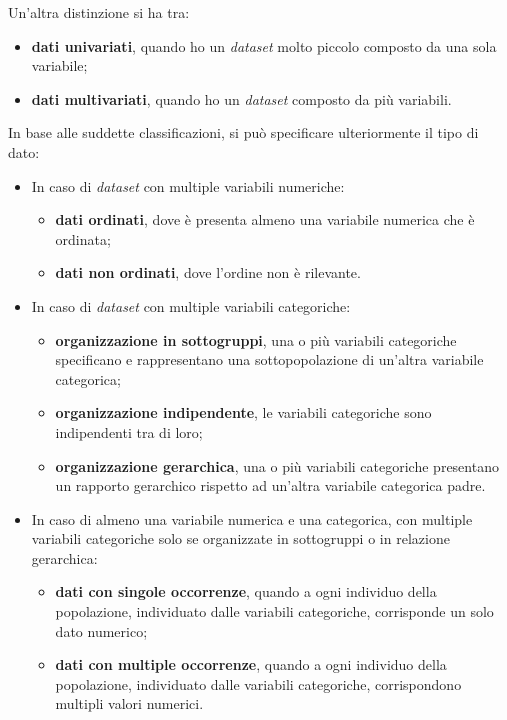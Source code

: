\bigskip
\noindent Un'altra distinzione si ha tra:
\begin{itemize}
    \item \textbf{dati univariati}, quando ho un \emph{dataset} molto piccolo composto da una sola variabile;
    \item \textbf{dati multivariati}, quando ho un \emph{dataset} composto da più variabili.
\end{itemize}

\bigskip
\noindent In base alle suddette classificazioni, si può specificare ulteriormente il tipo di dato:
\begin{itemize}
    \item In caso di \emph{dataset} con multiple variabili numeriche:
    \begin{itemize}
        \item \textbf{dati ordinati}, dove è presenta almeno una variabile numerica che è ordinata;
        \item \textbf{dati non ordinati}, dove l'ordine non è rilevante.
    \end{itemize}
    \item In caso di \emph{dataset} con multiple variabili categoriche:
    \begin{itemize}
        \item \textbf{organizzazione in sottogruppi}, una o più variabili categoriche specificano e rappresentano una sottopopolazione di un'altra variabile categorica;
        \item \textbf{organizzazione indipendente}, le variabili categoriche sono indipendenti tra di loro;
        \item \textbf{organizzazione gerarchica}, una o più variabili categoriche presentano un rapporto gerarchico rispetto ad un'altra variabile categorica padre.
    \end{itemize}
    \item In caso di almeno una variabile numerica e una categorica, con multiple variabili categoriche solo se organizzate in sottogruppi o in relazione gerarchica:
    \begin{itemize}
        \item \textbf{dati con singole occorrenze}, quando a ogni individuo della popolazione, individuato dalle variabili categoriche, corrisponde un solo dato numerico;
        \item \textbf{dati con multiple occorrenze}, quando a ogni individuo della popolazione, individuato dalle variabili categoriche, corrispondono multipli valori numerici.
    \end{itemize}
\end{itemize}


